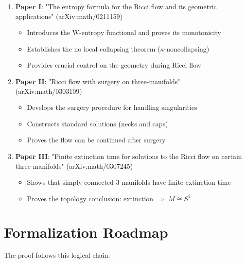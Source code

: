 \begin{enumerate}
\item \textbf{Paper I}: "The entropy formula for the Ricci flow and its geometric applications" (arXiv:math/0211159)
\begin{itemize}
\item Introduces the W-entropy functional and proves its monotonicity
\item Establishes the no local collapsing theorem ($\kappa$-noncollapsing)
\item Provides crucial control on the geometry during Ricci flow
\end{itemize}

\item \textbf{Paper II}: "Ricci flow with surgery on three-manifolds" (arXiv:math/0303109)
\begin{itemize}
\item Develops the surgery procedure for handling singularities
\item Constructs standard solutions (necks and caps)
\item Proves the flow can be continued after surgery
\end{itemize}

\item \textbf{Paper III}: "Finite extinction time for solutions to the Ricci flow on certain three-manifolds" (arXiv:math/0307245)
\begin{itemize}
\item Shows that simply-connected 3-manifolds have finite extinction time
\item Proves the topology conclusion: extinction $\Rightarrow$ $M \cong S^3$
\end{itemize}
\end{enumerate}

\section{Formalization Roadmap}

The proof follows this logical chain:

